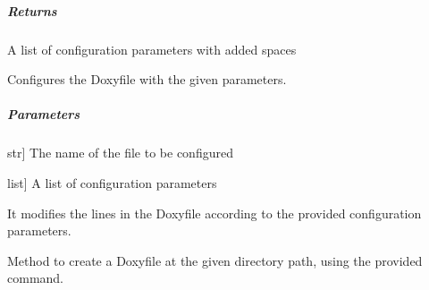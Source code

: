 \documentclass[letterpaper,10pt,english]{sphinxmanual}
\begin{document}
\begin{fulllineitems}
\begin{fulllineitems}
\begin{description}
\end{description}


\subparagraph{Returns}
\label{\detokenize{main.doxygen_management:id9}}\begin{description}
\sphinxAtStartPar
A list of configuration parameters with added spaces

\end{description}

\end{fulllineitems}


\begin{fulllineitems}
\label{\detokenize{main.doxygen_management:main.doxygen_management.doxyfile_configurator.DoxyfileConfigurator.configure_doxyfile}}
\pysigstartsignatures
{}
\pysigstopsignatures
\sphinxAtStartPar
Configures the Doxyfile with the given parameters.


\subparagraph{Parameters}
\label{\detokenize{main.doxygen_management:id10}}\begin{description}
\sphinxlineitem{filename}{[}str{]}
\sphinxAtStartPar
The name of the file to be configured

\sphinxlineitem{config\_parameters}{[}list{]}
\sphinxAtStartPar
A list of configuration parameters

\end{description}

\sphinxAtStartPar
It modifies the lines in the Doxyfile according to the provided configuration parameters.

\end{fulllineitems}


\begin{fulllineitems}
\label{\detokenize{main.doxygen_management:main.doxygen_management.doxyfile_configurator.DoxyfileConfigurator.create_doxyfile}}
\pysigstartsignatures
{}
\pysigstopsignatures
\sphinxAtStartPar
Method to create a Doxyfile at the given directory path, using the provided command.



\end{fulllineitems}
\end{fulllineitems}
\end{document}
